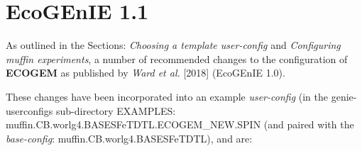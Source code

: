 \documentclass[11pt,fleqn]{book} %
\begin{document}

\newpage


\section{EcoGEnIE 1.1}

As outlined in the Sections: \textit{Choosing a template user-config} and \textit{Configuring muffin experiments}, a number of recommended changes to the configuration of \textbf{ECOGEM} as published by \textit{Ward et al.} [2018] (EcoGEnIE 1.0).

\vspace{1mm}
These changes have been incorporated into an example \textit{user-config} (in the \textsf{\footnotesize genie-userconfigs } sub-directory \textsf{\footnotesize EXAMPLES}: \textsf{\footnotesize muffin.CB.worlg4.BASESFeTDTL.ECOGEM\_NEW.SPIN} (and paired with the \textit{base-config}: \textsf{\footnotesize muffin.CB.worlg4.BASESFeTDTL}), and are:
\end{document}
